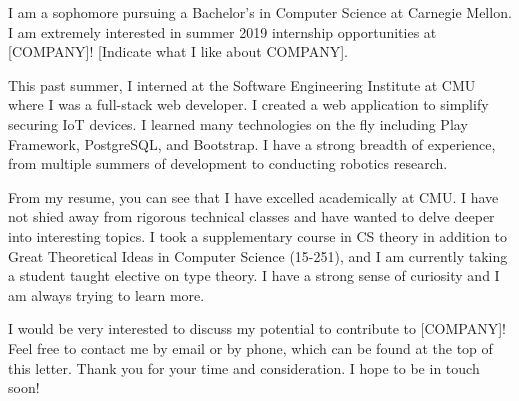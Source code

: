 \documentclass[11pt,stdletter,dateno,sigleft]{newlfm} %
\begin{document}
\begin{newlfm}


I am a sophomore pursuing a Bachelor's in Computer Science at Carnegie Mellon. I
am extremely interested in summer 2019 internship opportunities at [COMPANY]!
[Indicate what I like about COMPANY].

This past summer, I interned at the Software Engineering Institute at CMU where
I was a full-stack web developer. I created a web application to simplify
securing IoT devices. I learned many technologies on the fly including Play
Framework, PostgreSQL, and Bootstrap. I have a strong breadth of experience,
from multiple summers of development to conducting robotics research.

From my resume, you can see that I have excelled academically at CMU. I have not
shied away from rigorous technical classes and have wanted to delve deeper into
interesting topics. I took a supplementary course in CS theory in addition to
Great Theoretical Ideas in Computer Science (15-251), and I am currently taking
a student taught elective on type theory. I have a strong sense of curiosity and
I am always trying to learn more.

I would be very interested to discuss my potential to contribute to
[COMPANY]! Feel free to contact me by email or by phone, which can be
found at the top of this letter. Thank you for your time and consideration. I
hope to be in touch soon!


\end{newlfm}
\end{document}
